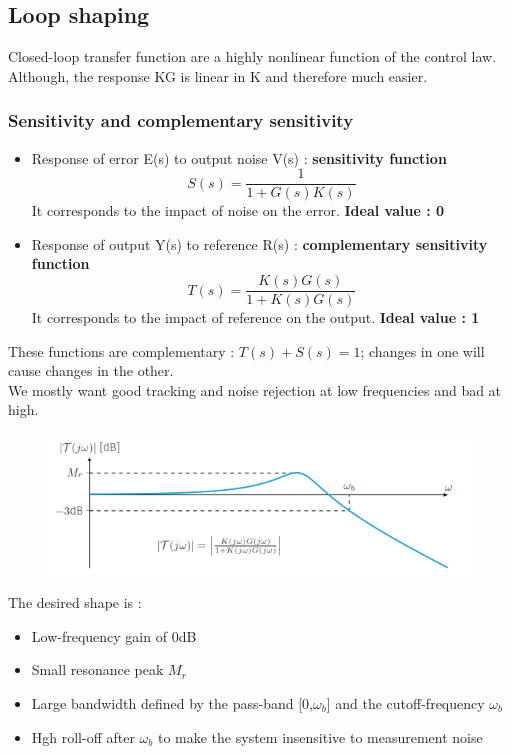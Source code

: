 \documentclass[../main.tex]{subfiles}
\begin{document}
\subsection{Loop shaping}
Closed-loop transfer function are a highly nonlinear function of the control law. Although, the response KG is linear in K and therefore much easier.\\

\subsubsection{Sensitivity and complementary sensitivity}
\begin{itemize}
    \item Response of error E(s) to output noise V(s) : \textbf{sensitivity function} \begin{equation}
        S(s) = \frac{1}{1+G(s)K(s)}
    \end{equation}
    It corresponds to the impact of noise on the error. \textbf{Ideal value : 0}\\
    \item Response of output Y(s) to reference R(s) : \textbf{complementary sensitivity function} \begin{equation}
        T(s) = \frac{K(s)G(s)}{1+K(s)G(s)}
    \end{equation}
    It corresponds to the impact of reference on the output. \textbf{Ideal value : 1}\\
\end{itemize}

These functions are complementary : $T(s)+S(s) = 1$; changes in one will cause changes in the other.\\
We mostly want good tracking and noise rejection at low frequencies and bad at high.\\

\begin{figure}[hbt!]
    \centering
    \includegraphics[width=.8\textwidth]{IMAGES/control/sensitivity.png}
\end{figure}

The desired shape is : \begin{itemize}
    \item Low-frequency gain of 0dB\\
    \item Small resonance peak $M_r$\\
    \item Large bandwidth defined by the pass-band [0,$\omega_b$] and the cutoff-frequency $\omega_b$\\
    \item Hgh roll-off after $\omega_b$ to make the system insensitive to measurement noise\\
\end{itemize}
\end{document}
